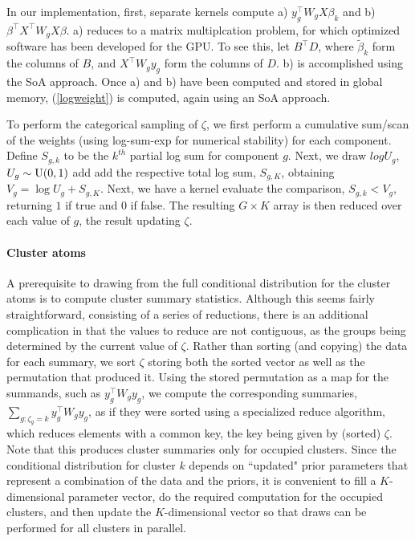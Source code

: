 {In our implementation, first, separate kernels compute a) $y_g^\top W_g X \beta_k$ and b) $\beta^\top X^\top W_g X \beta$. a) reduces to a matrix multiplcation problem, for which optimized software has been developed for the GPU. To see this, let $B^\top D$, where $\tilde{\beta}_k$ form the columns of $B$, and $X^\top W_g y_g$ form the columns of $D$. b) is accomplished using the SoA approach. Once a) and b) have been computed and stored in global memory, (\ref{logweight}) is computed, again using an SoA approach.

To perform the categorical sampling of $\zeta$, we first perform a cumulative sum/scan of the weights (using log-sum-exp for numerical stability) for each component. Define $S_{g,k}$ to be the $k^{th}$ partial log sum for component $g$. Next, we draw $log U_g$, $U_g \sim \operatorname{U}(0,1)$ add add the respective total log sum, $S_{g,K}$, obtaining $V_g = \log U_g + S_{g,K}$. Next, we have a kernel evaluate the comparison, $S_{g,k}<V_g$, returning $1$ if true and $0$ if false. The resulting $G\times K$ array is then reduced over each value of $g$, the result updating $\zeta$.

\paragraph{Cluster atoms}
A prerequisite to drawing from the full conditional distribution for the cluster atoms is to compute cluster summary statistics. Although this seems fairly straightforward, consisting of a series of reductions, there is an additional complication in that the values to reduce are not contiguous, as the groups being determined by the current value of $\zeta$. Rather than sorting (and copying) the data for each summary, we sort $\zeta$ storing both the sorted vector as well as the permutation that produced it. Using the stored permutation as a map for the summands, such as $y_g^\top W_g y_g$, we compute the corresponding summaries, $\sum_{g:\zeta_g=k}y_g^\top W_g y_g$, as if they were sorted using a specialized reduce algorithm, which reduces elements with a common key, the key being given by (sorted) $\zeta$. Note that this produces cluster summaries only for occupied clusters. Since the conditional distribution for cluster $k$ depends on ``updated" prior parameters that represent a combination of the data and the priors, it is convenient to fill a $K$-dimensional parameter vector, do the required computation for the occupied clusters, and then update the $K$-dimensional vector so that draws can be performed for all clusters in parallel.

}
